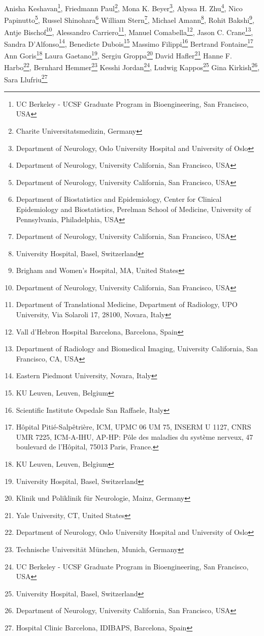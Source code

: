 \iflatexml
Anisha Keshavan\footnote[1]{UC Berkeley - UCSF Graduate Program in Bioengineering, San Francisco, USA},
Friedmann Paul\footnote[2]{Charite Universitatsmedizin, Germany},
Mona K. Beyer\footnote[3]{Department of Neurology, Oslo University Hospital and University of Oslo},
Alyssa H. Zhu\footnote[4]{Department of Neurology, University California, San Francisco,  USA},
Nico Papinutto\footnote[4]{Department of Neurology, University California, San Francisco,  USA},
Russel Shinohara\footnote[5]{Department of Biostatistics and Epidemiology, Center for Clinical Epidemiology and Biostatistics, Perelman School of Medicine, University of Pennsylvania, Philadelphia, USA}
William Stern\footnote[4]{Department of Neurology, University California, San Francisco,  USA},
Michael Amann\footnote[6]{University Hospital, Basel, Switzerland},
Rohit Bakshi\footnote[7]{Brigham and Women's Hospital, MA, United States},
Antje Bischof\footnote[4]{Department of Neurology, University California, San Francisco,  USA},
Alessandro Carriero\footnote[8]{Department of Translational Medicine, Department of Radiology,  UPO University, Via Solaroli 17, 28100, Novara, Italy},
Manuel Comabella\footnote[9]{Vall d’Hebron Hospital Barcelona, Barcelona, Spain},
Jason C. Crane\footnote[10]{Department of Radiology and Biomedical Imaging, University California, San Francisco, CA, USA},
Sandra D’Alfonso\footnote[11]{Eastern Piedmont University, Novara, Italy},
Benedicte Dubois\footnote[12]{KU Leuven, Leuven, Belgium}
Massimo Filippi\footnote[13]{Scientific Institute Ospedale San Raffaele, Italy}
Bertrand Fontaine\footnote[14]{Hôpital Pitié-Salpêtrière, ICM, UPMC 06 UM 75, INSERM U 1127, CNRS UMR 7225, ICM-A-IHU, AP-HP:  
Pôle des maladies du système nerveux, 47 boulevard de l'Hôpital, 75013  
Paris, France.}
Ann Goris\footnote[12]{KU Leuven, Leuven, Belgium}
Laura Gaetano\footnote[6]{University Hospital, Basel, Switzerland},
Sergiu Groppa\footnote[15]{Klinik und Poliklinik für Neurologie, Mainz, Germany}
David Hafler\footnote[16]{Yale University, CT, United States}
Hanne F. Harbo\footnote[3]{Department of Neurology, Oslo University Hospital and University of Oslo},
Bernhard Hemmer\footnote[17]{Technische Universität München, Munich, Germany}
Kesshi Jordan\footnote[1]{UC Berkeley - UCSF Graduate Program in Bioengineering, San Francisco, USA},
Ludwig Kappos\footnote[6]{University Hospital, Basel, Switzerland}
Gina Kirkish\footnote[4]{Department of Neurology, University California, San Francisco,  USA},
Sara Llufriu\footnote[18]{Hospital Clinic Barcelona, IDIBAPS, Barcelona, Spain}
